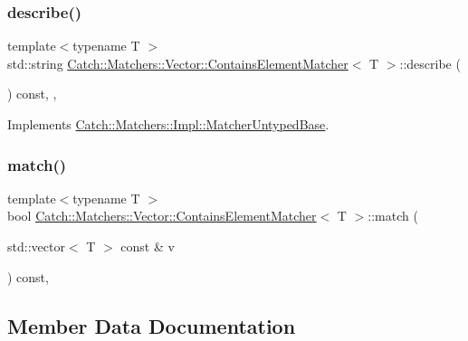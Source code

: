 \subsubsection{\texorpdfstring{describe()}{describe()}}
{\footnotesize\ttfamily template$<$typename T $>$ \\
std\+::string \mbox{\hyperlink{struct_catch_1_1_matchers_1_1_vector_1_1_contains_element_matcher}{Catch\+::\+Matchers\+::\+Vector\+::\+Contains\+Element\+Matcher}}$<$ T $>$\+::describe (\begin{DoxyParamCaption}{ }\end{DoxyParamCaption}) const\hspace{0.3cm}{\ttfamily [inline]}, {\ttfamily [override]}, {\ttfamily [virtual]}}



Implements \mbox{\hyperlink{class_catch_1_1_matchers_1_1_impl_1_1_matcher_untyped_base_a91d3a907dbfcbb596077df24f6e11fe2}{Catch\+::\+Matchers\+::\+Impl\+::\+Matcher\+Untyped\+Base}}.

\mbox{\label{struct_catch_1_1_matchers_1_1_vector_1_1_contains_element_matcher_a6a4be6e5642e267433d370649beb0fac}} 
\subsubsection{\texorpdfstring{match()}{match()}}
{\footnotesize\ttfamily template$<$typename T $>$ \\
bool \mbox{\hyperlink{struct_catch_1_1_matchers_1_1_vector_1_1_contains_element_matcher}{Catch\+::\+Matchers\+::\+Vector\+::\+Contains\+Element\+Matcher}}$<$ T $>$\+::match (\begin{DoxyParamCaption}\item[{std\+::vector$<$ T $>$ const \&}]{v }\end{DoxyParamCaption}) const\hspace{0.3cm}{\ttfamily [inline]}, {\ttfamily [override]}}



\subsection{Member Data Documentation}
\mbox{\label{struct_catch_1_1_matchers_1_1_vector_1_1_contains_element_matcher_ab7eada6c4bbce1d21b44773262f9cb23}} 
